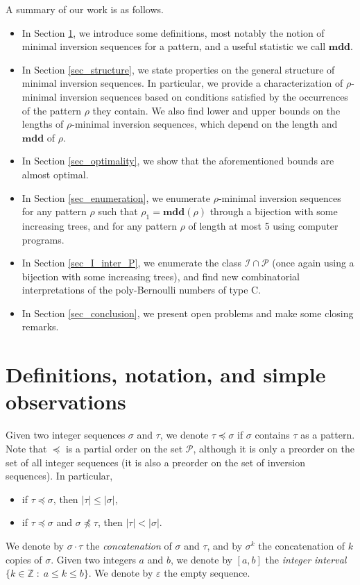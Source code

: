 \documentclass[a4paper,11pt]{article}
\theoremstyle{definition}
\theoremstyle{remark}
\newcommand{\I}{\mathcal{I}}
\renewcommand{\P}{\mathcal{P}}
\newcommand{\mdd}{\mathbf{mdd}}
\begin{document}
A summary of our work is as follows.
\begin{itemize}
    \item In Section \ref{sec_defs}, we introduce some definitions, most notably the notion of minimal inversion sequences for a pattern, and a useful statistic we call $\mdd$.
    \item In Section \ref{sec_structure}, we state properties on the general structure of minimal inversion sequences. In particular, we provide a characterization of $\rho$-minimal inversion sequences based on conditions satisfied by the occurrences of the pattern $\rho$ they contain. We also find lower and upper bounds on the lengths of $\rho$-minimal inversion sequences, which depend on the length and $\mdd$ of $\rho$.
    \item In Section \ref{sec_optimality}, we show that the aforementioned bounds are almost optimal.
    \item In Section \ref{sec_enumeration}, we enumerate $\rho$-minimal inversion sequences for any pattern $\rho$ such that $\rho_1 = \mdd(\rho)$ through a bijection with some increasing trees, and for any pattern $\rho$ of length at most 5 using computer programs.
    \item In Section \ref{sec_I_inter_P}, we enumerate the class $\I \cap \P$ (once again using a bijection with some increasing trees), and find new combinatorial interpretations of the poly-Bernoulli numbers of type C.
    \item In Section \ref{sec_conclusion}, we present open problems and  make some closing remarks.
\end{itemize}


\section{Definitions, notation, and simple observations} \label{sec_defs}
Given two integer sequences $\sigma$ and $\tau$, we denote $\tau \preceq \sigma$ if $\sigma$ contains $\tau$ as a pattern. Note that $\preceq$ is a partial order on the set $\P$, although it is only a preorder on the set of all integer sequences (it is also a preorder on the set of inversion sequences). In particular,
\begin{itemize}
    \item if $\tau \preceq \sigma$, then $|\tau| \leq |\sigma|$,
    \item if $\tau \preceq \sigma$ and $\sigma \npreceq \tau$, then $|\tau| < |\sigma|$.
\end{itemize}
We denote by $\sigma \cdot \tau$ the \emph{concatenation} of $\sigma$ and $\tau$, and by $\sigma^k$ the concatenation of $k$ copies of $\sigma$.
Given two integers $a$ and $b$, we denote by $[a,b]$ the \emph{integer interval} $\{k \in \mathbb Z \; : \; a \leq k \leq b\}$. We denote by $\varepsilon$ the empty sequence.
\end{document}
